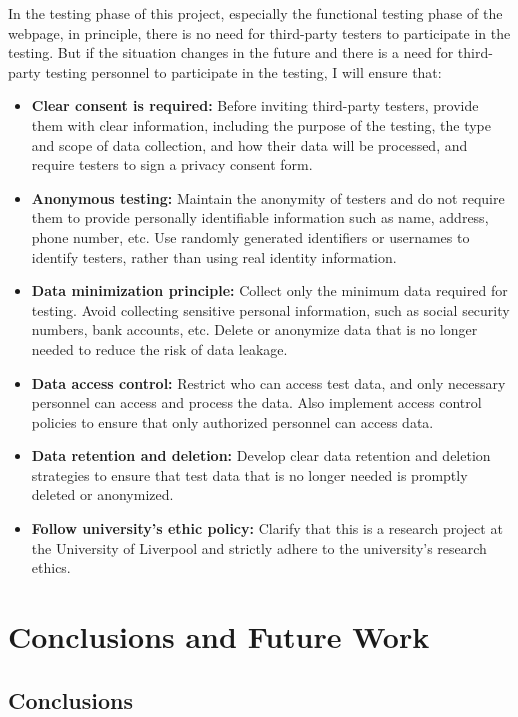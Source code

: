 \documentclass[twocolumn]{article}
\begin{document}
In the testing phase of this project, especially the functional testing phase of the webpage, in principle, there is no need for third-party testers to participate in the testing. But if the situation changes in the future and there is a need for third-party testing personnel to participate in the testing, I will ensure that:

\begin{itemize}
    \item \textbf{Clear consent is required: }Before inviting third-party testers, provide them with clear information, including the purpose of the testing, the type and scope of data collection, and how their data will be processed, and require testers to sign a privacy consent form.
    \item \textbf{Anonymous testing: }Maintain the anonymity of testers and do not require them to provide personally identifiable information such as name, address, phone number, etc. Use randomly generated identifiers or usernames to identify testers, rather than using real identity information.
    \item \textbf{Data minimization principle: }Collect only the minimum data required for testing. Avoid collecting sensitive personal information, such as social security numbers, bank accounts, etc. Delete or anonymize data that is no longer needed to reduce the risk of data leakage.
    \item \textbf{Data access control: }Restrict who can access test data, and only necessary personnel can access and process the data. Also implement access control policies to ensure that only authorized personnel can access data.
    \item \textbf{Data retention and deletion: }Develop clear data retention and deletion strategies to ensure that test data that is no longer needed is promptly deleted or anonymized.
    \item \textbf{Follow university's ethic policy: }Clarify that this is a research project at the University of Liverpool and strictly adhere to the university's research ethics.
\end{itemize}

\section{Conclusions and Future Work}

\subsection{Conclusions}
\end{document}
